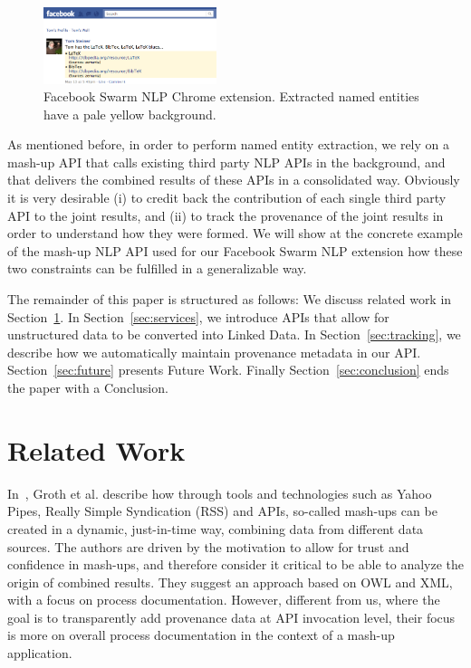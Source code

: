 \documentclass[conference]{IEEEtran}
\begin{document}
\begin{figure}[htb!]
  \centering
    \includegraphics[width=0.45\textwidth]{facebook-swarm-nlp.png}
  \caption{Facebook Swarm NLP Chrome extension. Extracted named entities have a pale yellow background.}     
  \label{fig:facebook}
\end{figure}

As mentioned before, in order to perform named entity extraction, we rely on a mash-up API that calls existing third party NLP APIs in the background, and that delivers the combined results of these APIs in a consolidated way. Obviously it is very desirable (i) to credit back the contribution of each single third party API to the joint results, and (ii) to track the provenance of the joint results in order to understand how they were formed. We will show at the concrete example of the mash-up NLP API used for our Facebook Swarm NLP extension how these two constraints can be fulfilled in a generalizable way.

The remainder of this paper is structured as follows: We discuss related work in Section~\ref{sec:related}. In Section~\ref{sec:services}, we introduce APIs that allow for unstructured data to be converted into Linked Data. In Section~\ref{sec:tracking}, we describe how we automatically maintain provenance metadata in our API. Section~\ref{sec:future} presents Future Work. Finally Section~\ref{sec:conclusion} ends the paper with a Conclusion.

\section{Related Work}\label{sec:related}
In~\cite{Groth:2009:MPD:1462159.1462162}, Groth et al. describe how through tools and technologies such as Yahoo Pipes, Really Simple Syndication (RSS) and APIs, so-called mash-ups can be created in a dynamic, just-in-time way, combining data from different data sources. The authors are driven by the motivation to allow for trust and confidence in mash-ups, and therefore consider it critical to be able to analyze the origin of combined results. They suggest an approach based on OWL and XML, with a focus on process documentation. However, different from us, where the goal is to transparently add provenance data at API invocation level, their focus is more on overall process documentation in the context of a mash-up application.
\end{document}
